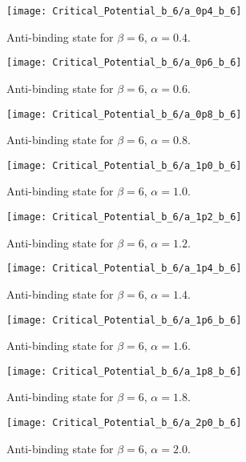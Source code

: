 \documentclass[twoclumn, a4, 11pt]{article}
\begin{document}
\begin{figure}[t!]
	\centering
	\texttt{[image: Critical\_Potential\_b\_6/a\_0p4\_b\_6]}
	\caption{Anti-binding state for $\beta = 6$, $\alpha = 0.4$.}
	\label{fig:a0p4b6}
\end{figure}

\begin{figure}[t!]
	\centering
	\texttt{[image: Critical\_Potential\_b\_6/a\_0p6\_b\_6]}
	\caption{Anti-binding state for $\beta = 6$, $\alpha = 0.6$.}
	\label{fig:a0p6b6}
\end{figure}

\begin{figure}[t!]
	\centering
	\texttt{[image: Critical\_Potential\_b\_6/a\_0p8\_b\_6]}
	\caption{Anti-binding state for $\beta = 6$, $\alpha = 0.8$.}
	\label{fig:a0p8b6}
\end{figure}

\begin{figure}[t!]
	\centering
	\texttt{[image: Critical\_Potential\_b\_6/a\_1p0\_b\_6]}
	\caption{Anti-binding state for $\beta = 6$, $\alpha = 1.0$.}
	\label{fig:a1p0b6}
\end{figure}

\begin{figure}[t!]
	\centering
	\texttt{[image: Critical\_Potential\_b\_6/a\_1p2\_b\_6]}
	\caption{Anti-binding state for $\beta = 6$, $\alpha = 1.2$.}
	\label{fig:a1p2b6}
\end{figure}

\begin{figure}[t!]
	\centering
	\texttt{[image: Critical\_Potential\_b\_6/a\_1p4\_b\_6]}
	\caption{Anti-binding state for $\beta = 6$, $\alpha = 1.4$.}
	\label{fig:a1p4b6}
\end{figure}

\begin{figure}[t!]
	\centering
	\texttt{[image: Critical\_Potential\_b\_6/a\_1p6\_b\_6]}
	\caption{Anti-binding state for $\beta = 6$, $\alpha = 1.6$.}
	\label{fig:a1p6b6}
\end{figure}


\pagebreak
\begin{figure}[t!]
	\centering
	\texttt{[image: Critical\_Potential\_b\_6/a\_1p8\_b\_6]}
	\caption{Anti-binding state for $\beta = 6$, $\alpha = 1.8$.}
	\label{fig:a1p8b6}
\end{figure}

\begin{figure}[t!]
	\centering
	\texttt{[image: Critical\_Potential\_b\_6/a\_2p0\_b\_6]}
	\caption{Anti-binding state for $\beta = 6$, $\alpha = 2.0$.}
	\label{fig:a2p0b6}
\end{figure}
\end{document}
